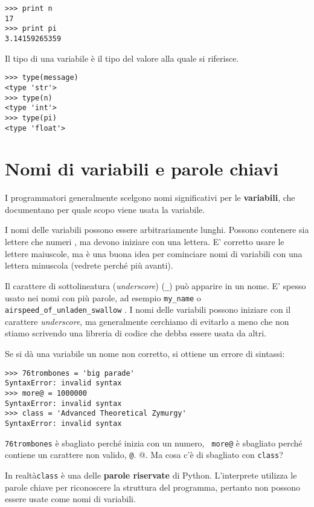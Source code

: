\beforeverb \begin{verbatim}
>>> print n
17
>>> print pi
3.14159265359 \end{verbatim} \afterverb
%
Il tipo di una variabile \`{e} il tipo del valore alla quale si
riferisce.

\beforeverb \begin{verbatim}
>>> type(message)
<type 'str'>
>>> type(n)
<type 'int'>
>>> type(pi)
<type 'float'> \end{verbatim} \afterverb
%
%
\section{Nomi di variabili e parole chiavi} 

I programmatori generalmente scelgono nomi significativi per le
\textbf{variabili}, che documentano per quale scopo viene usata la
variabile.


I nomi delle variabili possono essere arbitrariamente lunghi. Possono
contenere sia lettere che numeri , ma devono iniziare con una lettera.
E' corretto usare le lettere maiuscole, ma \`{e} una buona idea per
cominciare nomi di variabili con una lettera minuscola (vedrete
perch\'{e} pi\`{u} avanti).


Il carattere di sottolineatura ({\em underscore}) (\verb"_") pu\`{o}
apparire in un nome. E' spesso usato nei nomi con pi\`{u} parole, ad
esempio \verb"my_name" o \verb"airspeed_of_unladen_swallow" . I nomi
delle variabili possono iniziare con il carattere {\em underscore}, ma
generalmente cerchiamo di evitarlo a meno che non stiamo scrivendo una
libreria di codice che debba essere usata da altri.

 

Se si d\`{a} una variabile un nome non corretto, si ottiene un errore di
sintassi:

\beforeverb \begin{verbatim}
>>> 76trombones = 'big parade'
SyntaxError: invalid syntax
>>> more@ = 1000000
SyntaxError: invalid syntax
>>> class = 'Advanced Theoretical Zymurgy'
SyntaxError: invalid syntax \end{verbatim} \afterverb
%
{\tt 76trombones}  \`{e} sbagliato perch\'{e} inizia con un numero, {\tt
more@} \`{e} sbagliato perch\'{e} contiene un carattere non valido, 
{\tt @}.  @. Ma cosa c'\`{e} di sbagliato con  {\tt class}?

In realt\`{a}{\tt class} \`{e} una delle \textbf{parole riservate} di
Python. L'interprete utilizza le parole chiave per riconoscere la
struttura del programma, pertanto non possono essere usate come nomi di
variabili.


